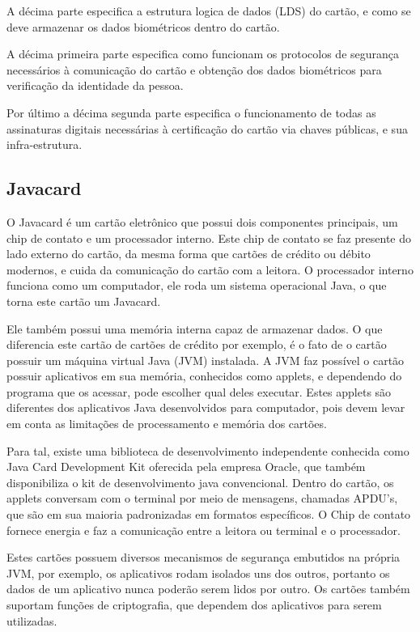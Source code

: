 \documentclass[11pt]{article}
\begin{document}
			 A décima parte especifica a estrutura logica de dados (LDS) do cartão, e como se deve armazenar os dados biométricos dentro do cartão.
			 
			 A décima primeira parte especifica como funcionam os protocolos de segurança necessários à comunicação do cartão e obtenção dos dados biométricos para verificação da identidade da pessoa.
			 
			 Por último a décima segunda parte especifica o funcionamento de todas as assinaturas digitais necessárias à certificação do cartão via chaves públicas, e sua infra-estrutura.

		

	\subsection{Javacard}
		
			

		 O Javacard é um cartão eletrônico que possui dois componentes principais, um chip de contato e um processador interno. Este chip de contato se faz presente do lado externo do cartão, da mesma forma que cartões de crédito ou débito modernos, e cuida da comunicação do cartão com a leitora. O processador interno funciona como um computador, ele roda um sistema operacional Java, o que torna este cartão um Javacard.
		 
		 Ele também possui uma memória interna capaz de armazenar dados. O que diferencia este cartão de cartões de crédito por exemplo, é o fato de o cartão possuir um máquina virtual Java (JVM) instalada. A JVM faz possível o cartão possuir aplicativos em sua memória, conhecidos como applets, e dependendo do programa que os acessar, pode escolher qual deles executar. Estes applets são diferentes dos aplicativos Java desenvolvidos para computador, pois devem levar em conta as limitações de processamento e memória dos cartões.
		 
		 Para tal, existe uma biblioteca de desenvolvimento independente conhecida como Java Card Development Kit oferecida pela empresa Oracle, que também disponibiliza o kit de desenvolvimento java convencional. Dentro do cartão, os applets conversam com o terminal por meio de mensagens, chamadas APDU's, que são em sua maioria padronizadas em formatos específicos. O Chip de contato fornece energia e faz a comunicação entre a leitora ou terminal e o processador. 
		 
		 Estes cartões possuem diversos mecanismos de segurança embutidos na própria JVM, por exemplo, os aplicativos rodam isolados uns dos outros, portanto os dados de um aplicativo nunca poderão serem lidos por outro. Os cartões também suportam funções de criptografia, que dependem dos aplicativos para serem utilizadas\parencite{JAVACHEN}.
\end{document}
